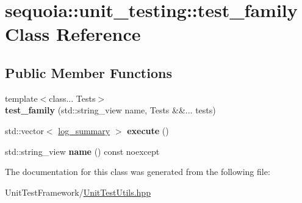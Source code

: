 \hypertarget{classsequoia_1_1unit__testing_1_1test__family}{}\section{sequoia\+::unit\+\_\+testing\+::test\+\_\+family Class Reference}
\label{classsequoia_1_1unit__testing_1_1test__family}
\subsection*{Public Member Functions}
\begin{DoxyCompactItemize}
\item 
\mbox{\label{classsequoia_1_1unit__testing_1_1test__family_a4d77c966f881bb9f753b88c2ff4c1545}} 
{\footnotesize template$<$class... Tests$>$ }\\{\bfseries test\+\_\+family} (std\+::string\+\_\+view name, Tests \&\&... tests)
\item 
\mbox{\label{classsequoia_1_1unit__testing_1_1test__family_a4f02fd729396cec281898f0b0ba750a5}} 
std\+::vector$<$ \mbox{\hyperlink{classsequoia_1_1unit__testing_1_1log__summary}{log\+\_\+summary}} $>$ {\bfseries execute} ()
\item 
\mbox{\label{classsequoia_1_1unit__testing_1_1test__family_aa7c80ba54f6c38a929011ba2e50f430c}} 
std\+::string\+\_\+view {\bfseries name} () const noexcept
\end{DoxyCompactItemize}


The documentation for this class was generated from the following file\+:\begin{DoxyCompactItemize}
\item 
Unit\+Test\+Framework/\mbox{\hyperlink{_unit_test_utils_8hpp}{Unit\+Test\+Utils.\+hpp}}\end{DoxyCompactItemize}
